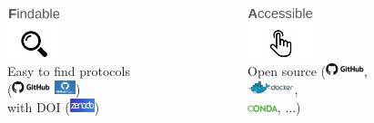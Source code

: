 \begin{frame}{\FAIRB}
\begin{columns}[t]
  \begin{column}{.25\textwidth}
      \begin{center}
      \includegraphics[height=1.5cm]{01_introduction/images/logo-FAIR-F.png}\\Easy to find protocols\\(\includegraphics[height=0.4cm]{shared/logo-github.png} \includegraphics[height=0.4cm]{08_sharing/images/github_pages.png})\\with DOI (\includegraphics[height=0.4cm]{shared/logo-zenodo.png})
      \end{center}
  \end{column}
  \begin{column}{.25\textwidth}
      \begin{center}
      \includegraphics[height=1.5cm]{01_introduction/images/logo-FAIR-A.png}\\Open source (\includegraphics[height=0.4cm]{shared/logo-github.png},\\ \includegraphics[height=0.4cm]{shared/logo-docker-paysage.png},\\ \includegraphics[height=0.2cm]{shared/logo-conda.png}, ...)
      \end{center}
  \end{column}

\end{columns}
\end{frame}
